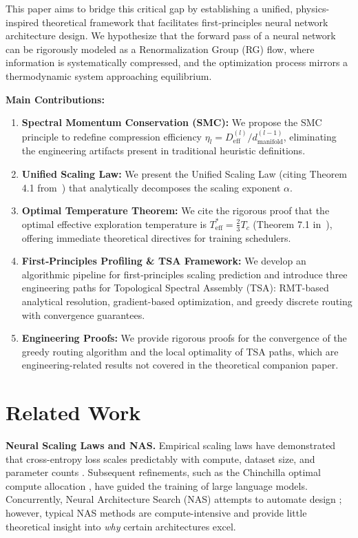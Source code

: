 \documentclass[11pt, a4paper]{article}
\theoremstyle{definition}
\begin{document}
This paper aims to bridge this critical gap by establishing a unified, physics-inspired theoretical framework that facilitates first‑principles neural network architecture design. We hypothesize that the forward pass of a neural network can be rigorously modeled as a Renormalization Group (RG) flow, where information is systematically compressed, and the optimization process mirrors a thermodynamic system approaching equilibrium.

\textbf{Main Contributions:}
\begin{enumerate}
    \item \textbf{Spectral Momentum Conservation (SMC):} We propose the SMC principle to redefine compression efficiency $\eta_l = D_{\text{eff}}^{(l)} / d_{\text{manifold}}^{(l-1)}$, eliminating the engineering artifacts present in traditional heuristic definitions.
    \item \textbf{Unified Scaling Law:} We present the Unified Scaling Law (citing Theorem 4.1 from~\cite{liu2024unified}) that analytically decomposes the scaling exponent $\alpha$.
    \item \textbf{Optimal Temperature Theorem:} We cite the rigorous proof that the optimal effective exploration temperature is $T_{\text{eff}}^* = \frac{2}{3}T_c$ (Theorem 7.1 in~\cite{liu2024unified}), offering immediate theoretical directives for training schedulers.
    \item \textbf{First‑Principles Profiling \& TSA Framework:} We develop an algorithmic pipeline for first‑principles scaling prediction and introduce three engineering paths for Topological Spectral Assembly (TSA): RMT-based analytical resolution, gradient-based optimization, and greedy discrete routing with convergence guarantees.
    \item \textbf{Engineering Proofs:} We provide rigorous proofs for the convergence of the greedy routing algorithm and the local optimality of TSA paths, which are engineering-related results not covered in the theoretical companion paper.
\end{enumerate}

\section{Related Work}
\label{sec:related-work}

\textbf{Neural Scaling Laws and NAS.} Empirical scaling laws have demonstrated that cross-entropy loss scales predictably with compute, dataset size, and parameter counts \cite{kaplan2020scaling}. Subsequent refinements, such as the Chinchilla optimal compute allocation \cite{hoffmann2022training}, have guided the training of large language models. Concurrently, Neural Architecture Search (NAS) attempts to automate design \cite{zoph2016neural, elsken2019neural}; however, typical NAS methods are compute-intensive and provide little theoretical insight into \textit{why} certain architectures excel.
\end{document}
